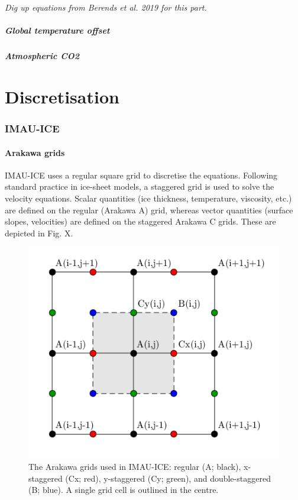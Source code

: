 \documentclass{article}
\begin{document}
\textit{Dig up equations from Berends et al. 2019 for this part.}

\subsubsection{Global temperature offset}

\subsubsection{Atmospheric CO2}

\newpage
\part{Discretisation}

\section{IMAU-ICE}

\subsection{Arakawa grids}

IMAU-ICE uses a regular square grid to discretise the equations. Following standard practice in ice-sheet models, a staggered grid is used to solve the velocity equations. Scalar quantities (ice thickness, temperature, viscosity, etc.) are defined on the regular (Arakawa A) grid, whereas vector quantities (surface slopes, velocities) are defined on the staggered Arakawa C grids. These are depicted in Fig. X.

\begin{figure}[H]
  \includegraphics[width=0.5\linewidth]{Fig_IMAUICE_grids.png}
  \caption{The Arakawa grids used in IMAU-ICE: regular (A; black), x-staggered (Cx; red), y-staggered (Cy; green), and double-staggered (B; blue). A single grid cell is outlined in the centre.}
\end{figure}
\end{document}
